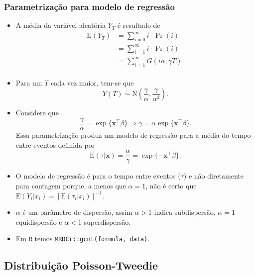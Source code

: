 \documentclass[10pt, aspectratio=169]{beamer}\usepackage[]{graphicx}\usepackage[]{color}
\begin{document}
\begin{frame}[allowframebreaks]
  \frametitle{Parametrização para modelo de regressão}
  \begin{itemize}
  \item A média da variável aleatória $Y_T$ é resultado de
    \begin{align*}
      \mathrm{E}(Y_T) &= \sum_{i=0}^{\infty} i\cdot \Pr(i) \\
           &= \sum_{i=1}^{\infty} i\cdot \Pr(i)\\
           &= \sum_{i=1}^{\infty} G(i\alpha, \gamma T).\\
    \end{align*}
  \item Para um $T$ cada vez maior, tem-se que
    \begin{equation*}
      Y(T)\; \dot{\sim}\; \text{N}\left(
        \frac{\gamma}{\alpha},
        \frac{\gamma}{\alpha^2}\right).
    \end{equation*}
  \item Considere que
    $$\frac{\gamma}{\alpha} = \exp\{\boldsymbol{x}^{\top}\beta\} \Rightarrow
    \gamma = \alpha \exp\{\boldsymbol{x}^{\top}\beta\}.$$
    Essa parametrização produz um modelo de regressão para a média
    do tempo entre eventos definida por
    $$\text{E}(\tau|\boldsymbol{x}) = \frac{\alpha}{\gamma} =
    \exp\{-\boldsymbol{x}^{\top}\beta\}.$$
  \item O modelo de regressão é para o tempo entre eventos ($\tau$)
    e não diretamente para contagem porque, a menos que
    $\alpha = 1$, não é certo que
    $\text{E}(Y_i|x_i) = [\text{E}(\tau_i|x_i)]^{-1}$.
  \item $\alpha$ é um parâmetro de dispersão, assim $\alpha > 1$ indica
  subdispersão, $\alpha = 1$ equidispersão e $\alpha < 1$ superdispersão.
  \item Em \texttt{R} temos \texttt{MRDCr::gcnt(formula, data)}.
  \end{itemize}
  
\end{frame}

\subsection{Distribuição Poisson-Tweedie}
\end{document}
